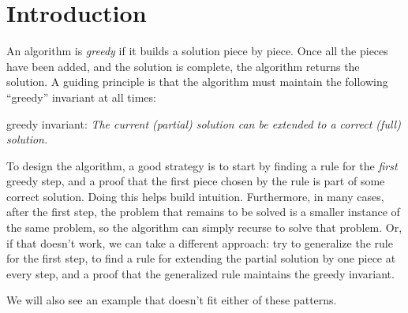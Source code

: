 \documentclass[11pt]{article}
\begin{document}

\newpage


\section{Introduction}\label{greedy: sec: intro}

An algorithm is \emph{greedy} if it builds a solution piece by piece.
Once all the pieces have been added, and the solution is complete, the algorithm returns the solution.
A guiding principle is that the algorithm must maintain the following ``greedy'' invariant at all times:

\medskip
\centerline
{\textsf{greedy invariant}: \em The current (partial) solution can be extended to a correct (full) solution.}
\medskip

To design the algorithm, a good strategy is to start by finding a rule for the \emph{first} greedy step,
and a proof that the first piece chosen by the rule is part of some correct solution.
Doing this helps build intuition.
Furthermore, in many cases, after the first step, the problem that remains to be solved
is a smaller instance of the same problem,
so the algorithm can simply recurse to solve that problem.
Or, if that doesn't work, we can take a different approach:
try to generalize the rule for the first step,
to find a rule for extending the partial solution by one piece at every step,
and a proof that the generalized rule maintains the greedy invariant.

We will also see an example that doesn't fit either of these patterns.

\newpage

\newpage

\newpage

\newpage

\newpage

\newpage

\newpage

\newpage


\end{document}
